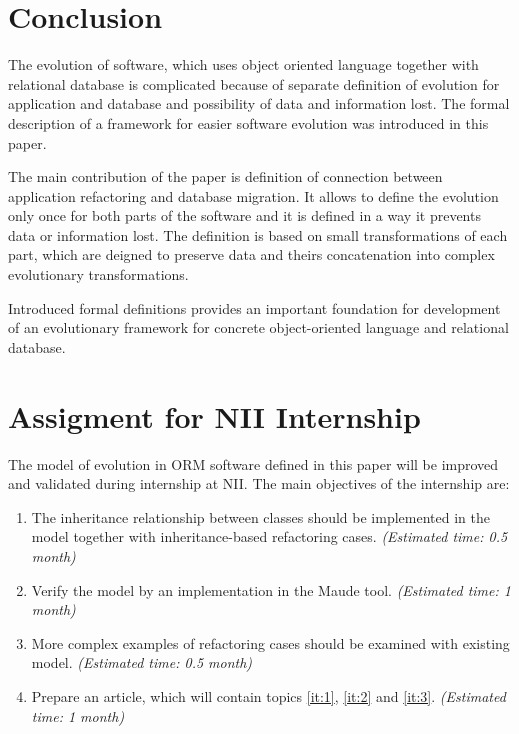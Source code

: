 \documentclass[11pt]{article}
\begin{document}
 
 
\section{Conclusion}
The evolution of software, which uses object oriented language together with relational database is complicated because of separate definition of evolution for application and database and possibility of data and information lost. The formal description of a framework for easier software evolution was introduced in this paper. 

The main contribution of the paper is definition of connection between application refactoring and database migration. It allows to define the evolution only once for both parts of the software and it is defined in a way it prevents data or information lost. The definition is based on small transformations of each part, which are deigned to preserve data and theirs concatenation into complex evolutionary transformations.

Introduced formal definitions provides an important foundation for development of an evolutionary framework for concrete object-oriented language and relational database.

\newpage
\appendix
\section{Assigment for NII Internship}
The model of evolution in ORM software defined in this paper will be improved and validated during internship at NII. The main objectives of the internship are:
\begin{enumerate}
	\item \label{it:1} The inheritance relationship between classes should be implemented in the model together with inheritance-based refactoring cases. \emph{(Estimated time: 0.5 month)}
	\item \label{it:2} Verify the model by an implementation in the Maude tool. \emph{(Estimated time: 1 month)}
	\item \label{it:3} More complex examples of refactoring cases should be examined with existing model.  \emph{(Estimated time: 0.5 month)}
	\item Prepare an article, which will contain topics \ref{it:1}, \ref{it:2} and \ref{it:3}. \emph{(Estimated time: 1 month)}
\end{enumerate}

\newpage
\end{document}
